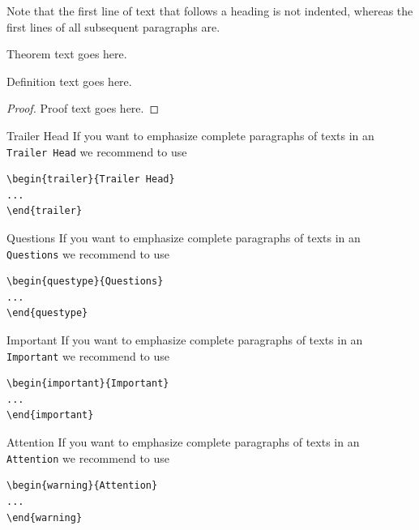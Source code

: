 \documentclass[graybox]{SNmult}
\begin{document}
Note that the first line of text that follows a heading is not indented, whereas the first lines of all subsequent paragraphs are.
%
%
\begin{theorem}
Theorem text goes here.
\end{theorem}
%
\begin{definition}
Definition text goes here.
\end{definition}
%
\begin{proof}
Proof text goes here.
\end{proof}
%
\begin{trailer}{Trailer Head}
If you want to emphasize complete paragraphs of texts in an \verb|Trailer Head| we recommend to
use  \begin{verbatim}\begin{trailer}{Trailer Head}
...
\end{trailer}\end{verbatim}
\end{trailer}
%
\begin{questype}{Questions}
If you want to emphasize complete paragraphs of texts in an \verb|Questions| we recommend to
use  \begin{verbatim}\begin{questype}{Questions}
...
\end{questype}\end{verbatim}
\end{questype}
\eject%
\begin{important}{Important}
If you want to emphasize complete paragraphs of texts in an \verb|Important| we recommend to
use  \begin{verbatim}\begin{important}{Important}
...
\end{important}\end{verbatim}
\end{important}
%
\begin{warning}{Attention}
If you want to emphasize complete paragraphs of texts in an \verb|Attention| we recommend to
use  \begin{verbatim}\begin{warning}{Attention}
...
\end{warning}\end{verbatim}
\end{warning}
\end{document}
